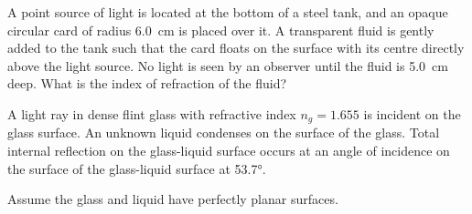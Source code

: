 \documentclass{../../ossphysics}
\begin{document}
\begin{questions}
  \question A point source of light is located at the bottom of a steel tank,
  and an opaque circular card of radius \SI{6.0}{\centi\metre} is placed over
  it. A transparent fluid is gently added to the tank such that the card floats
  on the surface with its centre directly above the light source. No light is
  seen by an observer until the fluid is \SI{5.0}{\centi\metre} deep. What is
  the index of refraction of the fluid?
  \vspace{\stretch1}
  
  \newpage
  
  \question A light ray in dense flint glass with refractive index $n_g=1.655$
  is incident on the glass surface. An unknown liquid condenses on the surface
  of the glass. Total internal reflection on the glass-liquid surface occurs at
  an angle of incidence on the surface of the glass-liquid surface at
  \ang{53.7}.
  Assume the glass and liquid have perfectly planar surfaces.
  

\end{questions}
\end{document}
